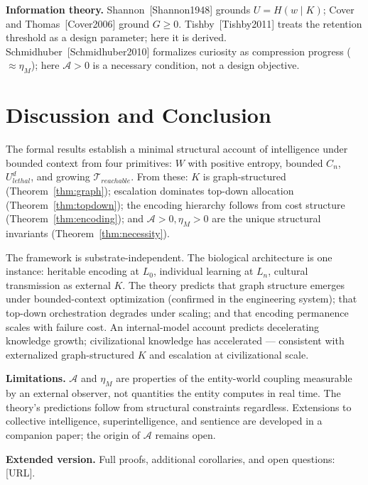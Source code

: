 \documentclass[11pt]{article}
\begin{document}
\textbf{Information theory.} Shannon~[Shannon1948] grounds $U = H(w \mid K)$; Cover and Thomas~[Cover2006] ground $G \geq 0$. Tishby~[Tishby2011] treats the retention threshold as a design parameter; here it is derived. Schmidhuber~[Schmidhuber2010] formalizes curiosity as compression progress ($\approx \eta_M$); here $\mathcal{A} > 0$ is a necessary condition, not a design objective.

\section{Discussion and Conclusion}

The formal results establish a minimal structural account of intelligence under bounded context from four primitives: $W$ with positive entropy, bounded $C_n$, $U_{lethal}^d$, and growing $\mathcal{T}_{reachable}$. From these: $K$ is graph-structured (Theorem~\ref{thm:graph}); escalation dominates top-down allocation (Theorem~\ref{thm:topdown}); the encoding hierarchy follows from cost structure (Theorem~\ref{thm:encoding}); and $\mathcal{A} > 0, \eta_M > 0$ are the unique structural invariants (Theorem~\ref{thm:necessity}).

The framework is substrate-independent. The biological architecture is one instance: heritable encoding at $L_0$, individual learning at $L_n$, cultural transmission as external $K$. The theory predicts that graph structure emerges under bounded-context optimization (confirmed in the engineering system); that top-down orchestration degrades under scaling; and that encoding permanence scales with failure cost. An internal-model account predicts decelerating knowledge growth; civilizational knowledge has accelerated --- consistent with externalized graph-structured $K$ and escalation at civilizational scale.

\textbf{Limitations.} $\mathcal{A}$ and $\eta_M$ are properties of the entity-world coupling measurable by an external observer, not quantities the entity computes in real time. The theory's predictions follow from structural constraints regardless. Extensions to collective intelligence, superintelligence, and sentience are developed in a companion paper; the origin of $\mathcal{A}$ remains open.

\bigskip
\noindent\textbf{Extended version.} Full proofs, additional corollaries, and open questions: [URL].
\end{document}
